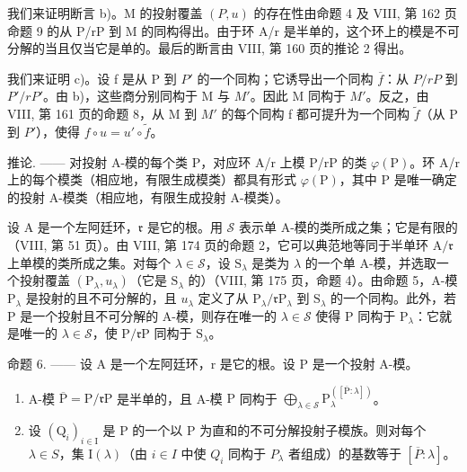 我们来证明断言 b)。M 的投射覆盖 \((P, u)\) 的存在性由命题 4 及 VIII, 第 162 页命题 9 的从 P/rP 到 M 的同构得出。由于环 A/r 是半单的，这个环上的模是不可分解的当且仅当它是单的。最后的断言由 VIII, 第 160 页的推论 2 得出。

我们来证明 c)。设 f 是从 P 到 \(P'\) 的一个同构；它诱导出一个同构 \(\overline{f}\)：从 \(P/rP\) 到 \(P'/rP'\)。由 b)，这些商分别同构于 M 与 \(M'\)。因此 M 同构于 \(M'\)。反之，由 VIII, 第 161 页的命题 8，从 M 到 \(M'\) 的每个同构 f 都可提升为一个同构 \(\widetilde{f}\)（从 P 到 \(P'\)），使得 \(f \circ u = u' \circ \widetilde{f}\)。

推论. —— 对投射 A-模的每个类 P，对应环 A/r 上模 P/rP 的类 \(\varphi(\mathrm{P})\)。环 A/r 上的每个模类（相应地，有限生成模类）都具有形式 \(\varphi(\mathrm{P})\)，其中 P 是唯一确定的投射 A-模类（相应地，有限生成投射 A-模类）。

设 A 是一个左阿廷环，\(\mathfrak{r}\) 是它的根。用 \(\mathcal{S}\) 表示单 A-模的类所成之集；它是有限的（VIII, 第 51 页）。由 VIII, 第 174 页的命题 2，它可以典范地等同于半单环 \(\mathrm{A} / \mathfrak{r}\) 上单模的类所成之集。对每个 \(\lambda \in \mathcal{S}\)，设 \(\mathrm{S}_{\lambda}\) 是类为 \(\lambda\) 的一个单 A-模，并选取一个投射覆盖 \((\mathrm{P}_{\lambda}, u_{\lambda})\)（它是 \(\mathrm{S}_{\lambda}\) 的）（VIII, 第 175 页，命题 4）。由命题 5，A-模 \(\mathrm{P}_{\lambda}\) 是投射的且不可分解的，且 \(u_{\lambda}\) 定义了从 \(\mathrm{P}_{\lambda} / \mathfrak{r}\mathrm{P}_{\lambda}\) 到 \(\mathrm{S}_{\lambda}\) 的一个同构。此外，若 P 是一个投射且不可分解的 A-模，则存在唯一的 \(\lambda \in \mathcal{S}\) 使得 P 同构于 \(\mathrm{P}_{\lambda}\)：它就是唯一的 \(\lambda \in \mathcal{S}\)，使 \(\mathrm{P} / \mathfrak{r}\mathrm{P}\) 同构于 \(\mathrm{S}_{\lambda}\)。

命题 6. —— 设 A 是一个左阿廷环，r 是它的根。设 P 是一个投射 A-模。

\begin{enumerate}
\def\labelenumi{\alph{enumi})}
\item
  A-模 \(\overline{\mathrm{P}} = \mathrm{P} / \mathfrak{r}\mathrm{P}\) 是半单的，且 A-模 \(\mathrm{P}\) 同构于 \(\bigoplus_{\lambda \in \mathcal{S}}\mathrm{P}_{\lambda}^{([\overline{\mathrm{P}}:\lambda ])}\)。
\item
  设 \((\mathrm{Q}_{i})_{i\in\mathrm{I}}\) 是 P 的一个以 P 为直和的不可分解投射子模族。则对每个 \(\lambda\in S\)，集 \(\mathrm{I}(\lambda)\)（由 \(i\in I\) 中使 \(Q_{i}\) 同构于 \(P_{\lambda}\) 者组成）的基数等于 \([\overline{P}:\lambda]\)。
\end{enumerate}

